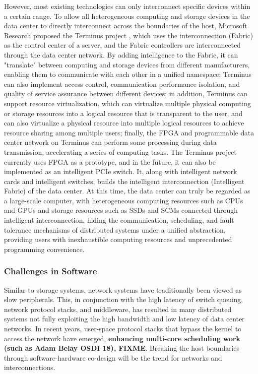 However, most existing technologies can only interconnect specific devices within a certain range. To allow all heterogeneous computing and storage devices in the data center to directly interconnect across the boundaries of the host, Microsoft Research proposed the Terminus project \cite{direct-universal-access-making-data-center-resources-available-to-fpga}, which uses the interconnection (Fabric) as the control center of a server, and the Fabric controllers are interconnected through the data center network. By adding intelligence to the Fabric, it can "translate" between computing and storage devices from different manufacturers, enabling them to communicate with each other in a unified namespace; Terminus can also implement access control, communication performance isolation, and quality of service assurance between different devices; in addition, Terminus can support resource virtualization, which can virtualize multiple physical computing or storage resources into a logical resource that is transparent to the user, and can also virtualize a physical resource into multiple logical resources to achieve resource sharing among multiple users; finally, the FPGA and programmable data center network on Terminus can perform some processing during data transmission, accelerating a series of computing tasks. The Terminus project currently uses FPGA as a prototype, and in the future, it can also be implemented as an intelligent PCIe switch. It, along with intelligent network cards and intelligent switches, builds the intelligent interconnection (Intelligent Fabric) of the data center. At this time, the data center can truly be regarded as a large-scale computer, with heterogeneous computing resources such as CPUs and GPUs and storage resources such as SSDs and SCMs connected through intelligent interconnection, hiding the communication, scheduling, and fault tolerance mechanisms of distributed systems under a unified abstraction, providing users with inexhaustible computing resources and unprecedented programming convenience.

\subsubsection{Challenges in Software}

Similar to storage systems, network systems have traditionally been viewed as slow peripherals. This, in conjunction with the high latency of switch queuing, network protocol stacks, and middleware, has resulted in many distributed systems not fully exploiting the high bandwidth and low latency of data center networks. In recent years, user-space protocol stacks that bypass the kernel to access the network have emerged, \textbf{enhancing multi-core scheduling work (such as Adam Belay OSDI 18), FIXME}. Breaking the host boundaries through software-hardware co-design will be the trend for networks and interconnections.

